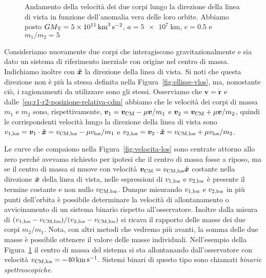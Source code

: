 {\begin{figure}
  \centering
  
  \caption[Andamento della velocità dei due corpi nella direzione della linea di
  vista in funzione dell'anomalia
  vera]{Andamento della velocità dei due corpi lungo la direzione della linea di
    vista in funzione dell'anomalia vera delle loro orbite. Abbiamo posto
    $GM_\textup{T} = \SI{5e11}{\cubic\kilo\metre\per\square\second}$,
    $a = \SI{5e7}{\kilo\metre}$, $e=0.5$ e $m_1/m_2=5$}
  \label{fig:velocita-los-due-corpi}
\end{figure}
Consideriamo nuovamente due corpi che interagiscono gravitazionalmente e sia
dato un sistema di riferimento inerziale con origine nel centro di
massa. Indichiamo inoltre con $\hat{\bm{x}}$ la direzione della linea di vista. Si
noti che questa direzione non è più la stessa definita nella
Figura~\ref{fig:ellisse-vlos}, ma, nonostante ciò, i ragionamenti da utilizzare
sono gli stessi. Osserviamo che $\bm{v}=\dot{\bm{r}}$ e
dalle~\eqref{eq:r1-r2-posizione-relativa-cdm} abbiamo che le velocità dei corpi
di massa $m_1$ e $m_2$ sono, rispettivamente,
$\bm{v}_1 = \bm{v}_\textup{CM}-\mu\bm{v}/m_1$ e
$\bm{v}_2 = \bm{v}_\textup{CM} + \mu\bm{v}/m_2$, quindi le corrispondenti
velocità lungo la direzione della linea di vista sono
$v_{1,\textup{los}} = \bm{v}_1 \cdot \hat{\bm{x}} = v_\textup{CM,los}-\mu
v_\textup{los}/m_1$
e
$v_{2,\textup{los}} = \bm{v}_2 \cdot \hat{\bm{x}} = v_\textup{CM,los} + \mu
v_\textup{los}/m_2$.

Le curve che compaiono nella Figura~\ref{fig:velocita-los} sono centrate attorno
allo zero perché avevamo richiesto per ipotesi che il centro di massa fosse a
riposo, ma se il centro di massa si muove con velocità
$\bm{v}_\textup{CM} = v_\textup{CM,los}\hat{\bm{x}}$ costante nella direzione
$\hat{\bm{x}}$ della linea di vista, nelle espressioni di $v_{1,\textup{los}}$ e
$v_{2,\textup{los}}$ è presente il termine costante e non nullo
$v_\textup{CM,los}$. Dunque misurando $v_{1,\textup{los}}$ e
$v_{2,\textup{los}}$ in più punti dell'orbita è possibile determinare la
velocità di allontanamento o avvicinamento di un sistema binario rispetto
all'osservatore. Inoltre dalla misura di
$(v_{1,\textup{los}}-v_{\textup{CM,los}})/(v_{2,\textup{los}}-v_{\textup{CM,los}})$
si ricava il rapporto delle masse dei due corpi $m_2/m_1$. Nota, con altri
metodi che vedremo più avanti, la somma delle due masse è possibile ottenere il
valore delle masse individuali. Nell'esempio della
Figura~\ref{fig:velocita-los-due-corpi} il centro di massa del sistema si sta
allontanando dall'osservatore con velocità $v_\textup{CM,los} =
\SI{-40}{\kilo\metre\per\second}$. Sistemi binari di questo tipo sono chiamati
\emph{binarie spettroscopiche}.

}
